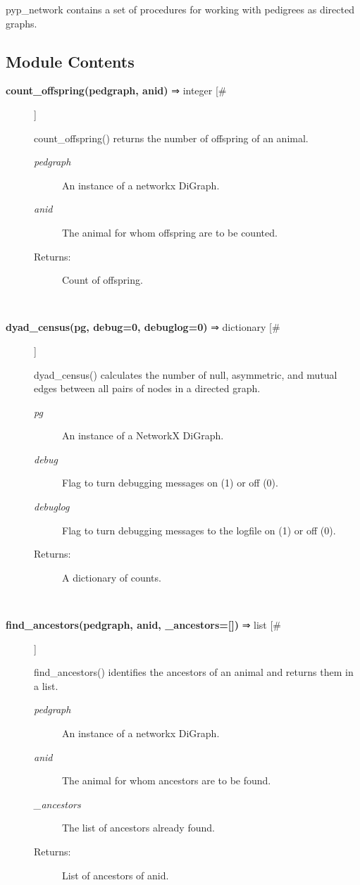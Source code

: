 \par pyp\_network contains a set of procedures for working with pedigrees as directed
graphs.
\subsection*{Module Contents}
\begin{description}
\item[\textbf{count\_offspring(pedgraph, anid)} ⇒ integer [\#]
]
\par count\_offspring() returns the number of offspring of an animal.
\begin{description}
\item[\textit{pedgraph}
]
An instance of a networkx DiGraph.
\item[\textit{anid}
]
The animal for whom offspring are to be counted.
\item[Returns:
]
Count of offspring.
\end{description}\\

\item[\textbf{dyad\_census(pg, debug=0, debuglog=0)} ⇒ dictionary [\#]
]
\par dyad\_census() calculates the number of null, asymmetric, and
mutual edges between all pairs of nodes in a directed graph.
\begin{description}
\item[\textit{pg}
]
An instance of a NetworkX DiGraph.
\item[\textit{debug}
]
Flag to turn debugging messages on (1) or off (0).
\item[\textit{debuglog}
]
Flag to turn debugging messages to the logfile  on (1) or off (0).
\item[Returns:
]
A dictionary of counts.
\end{description}\\

\item[\textbf{find\_ancestors(pedgraph, anid, \_ancestors=[])} ⇒ list [\#]
]
\par find\_ancestors() identifies the ancestors of an animal and returns them in a list.
\begin{description}
\item[\textit{pedgraph}
]
An instance of a networkx DiGraph.
\item[\textit{anid}
]
The animal for whom ancestors are to be found.
\item[\textit{\_ancestors}
]
The list of ancestors already found.
\item[Returns:
]
List of ancestors of anid.
\end{description}\\


\end{description}
